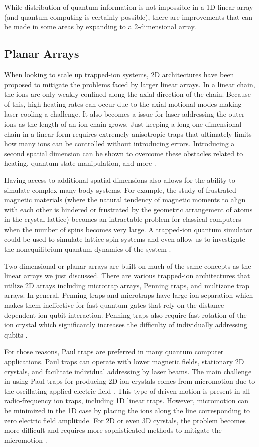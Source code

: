 While distribution of quantum information is not impossible in a 1D linear array (and quantum computing is certainly possible), there are improvements that can be made in some areas by expanding to a 2-dimensional array.

\subsection{Planar Arrays}
When looking to scale up trapped-ion systems, 2D architectures have been proposed to mitigate the problems faced by larger linear arrays. In a linear chain, the ions are only weakly confined along the axial direction of the chain. Because of this, high heating rates can occur due to the axial motional modes making laser cooling a challenge. It also becomes a issue for laser-addressing the outer ions as the length of an ion chain grows. Just keeping a long one-dimensional chain in a linear form requires extremely anisotropic traps that ultimately limits how many ions can be controlled without introducing errors. Introducing a second spatial dimension can be shown to overcome these obstacles related to heating, quantum state manipulation, and more \cite{Kiesenhofer}.

Having access to additional spatial dimensions also allows for the ability to simulate complex many-body systems. For example, the study of frustrated magnetic materials (where the natural tendency of magnetic moments to align with each other is hindered or frustrated by the geometric arrangement of atoms in the crystal lattice) becomes an intractable problem for classical computers when the number of spins becomes very large. A trapped-ion quantum simulator could be used to simulate lattice spin systems and even allow us to investigate the nonequilibrium quantum dynamics of the system \cite{Yoshimura}.

Two-dimensional or planar arrays are built on much of the same concepts as the linear arrays we just discussed. There are various trapped-ion architectures that utilize 2D arrays including microtrap arrays, Penning traps, and multizone trap arrays. In general, Penning traps and microtraps have large ion separation which makes them ineffective for fast quantum gates that rely on the distance dependent ion-qubit interaction. Penning traps also require fast rotation of the ion crystal which significantly increases the difficulty of individually addressing qubits \cite{STWang}. 

For those reasons, Paul traps are preferred in many quantum computer applications. Paul traps can operate with lower magnetic fields, stationary 2D crystals, and facilitate individual addressing by laser beams. The main challenge in using Paul traps for producing 2D ion crystals comes from micromotion due to the oscillating applied electric field \cite{YeWang}. This type of driven motion is present in all radio-frequency ion traps, including 1D linear traps. However, micromotion can be minimized in the 1D case by placing the ions along the line corresponding to zero electric field amplitude. For 2D or even 3D cyrstals, the problem becomes more difficult and requires more sophisticated methods to mitigate the micromotion \cite{Kato2}.

